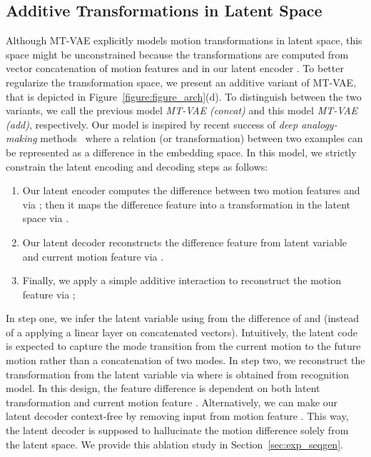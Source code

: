\documentclass[runningheads]{llncs}
\newcommand{\cutsubsectionup}{\vspace*{-0.1in}}
\newcommand{\cutsubsectiondown}{\vspace*{-0.07in}}
\begin{document}
\cutsubsectionup
\subsection{Additive Transformations in Latent Space}
\label{sec:tcvae_learning}
\cutsubsectiondown

Although MT-VAE explicitly models motion transformations in latent space, this space might be unconstrained because the transformations are computed from vector concatenation of motion features  and  in our latent encoder .
To better regularize the transformation space, we present an additive variant of MT-VAE, that is depicted in Figure~\ref{figure:figure_arch}(d).
To distinguish between the two variants, we call the previous model \emph{MT-VAE (concat)} and this model \emph{MT-VAE (add)}, respectively.
Our model is inspired by recent success of \emph{deep analogy-making} methods~\cite{reed2015deep,villegas2017decomposing} where a relation (or transformation) between two examples can be represented as a difference in the embedding space.
In this model, we strictly constrain the latent encoding and decoding steps as follows:
\begin{enumerate}
    \item Our latent encoder  computes the difference between two motion features  and  via  ; then it maps the difference feature  into a transformation in the latent space via .
    \item Our latent decoder  reconstructs the difference feature  from latent variable  and current motion feature  via .
    \item Finally, we apply a simple additive interaction to reconstruct the motion feature via ;\\
\end{enumerate}
\vspace*{-0.16in}

In step one, we infer the latent variable using  from the difference of  and  (instead of a applying a linear layer on concatenated vectors).
Intuitively, the latent code is expected to capture the mode transition from the current motion to the future motion rather than a concatenation of two modes.
In step two, we reconstruct the transformation from the latent variable via  where  is obtained from recognition model.
In this design, the feature difference is dependent on both latent transformation  and current motion feature .
Alternatively, we can make our latent decoder  context-free by removing input from motion feature .
This way, the latent decoder is supposed to hallucinate the motion difference solely from the latent space. We provide this ablation study in Section~\ref{sec:exp_seqgen}.
\end{document}
